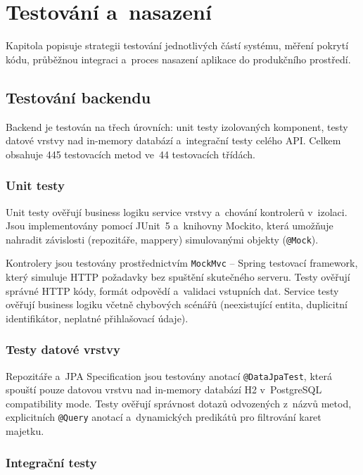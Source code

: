 \chapter{Testování a~nasazení}\label{chap:testing}

\begin{chapterabstract}
	Kapitola popisuje strategii testování jednotlivých částí systému, měření pokrytí kódu, průběžnou integraci a~proces nasazení aplikace do produkčního prostředí.
\end{chapterabstract}

\section{Testování backendu}

Backend je testován na třech úrovních: unit testy izolovaných komponent, testy datové vrstvy nad in-memory databází a~integrační testy celého API. Celkem obsahuje 445 testovacích metod ve~44 testovacích třídách.

\subsection{Unit testy}

Unit testy ověřují business logiku service vrstvy a~chování kontrolerů v~izolaci. Jsou implementovány pomocí JUnit~5 a~knihovny Mockito, která umožňuje nahradit závislosti (repozitáře, mappery) simulovanými objekty (\texttt{@Mock}).

Kontrolery jsou testovány prostřednictvím \texttt{MockMvc} -- Spring testovací framework, který simuluje HTTP požadavky bez spuštění skutečného serveru. Testy ověřují správné HTTP kódy, formát odpovědí a~validaci vstupních dat. Service testy ověřují business logiku včetně chybových scénářů (neexistující entita, duplicitní identifikátor, neplatné přihlašovací údaje).

\subsection{Testy datové vrstvy}

Repozitáře a~JPA Specification jsou testovány anotací \texttt{@DataJpaTest}, která spouští pouze datovou vrstvu nad in-memory databází H2 v~PostgreSQL compatibility mode. Testy ověřují správnost dotazů odvozených z~názvů metod, explicitních \texttt{@Query} anotací a~dynamických predikátů pro filtrování karet majetku.

\subsection{Integrační testy}


